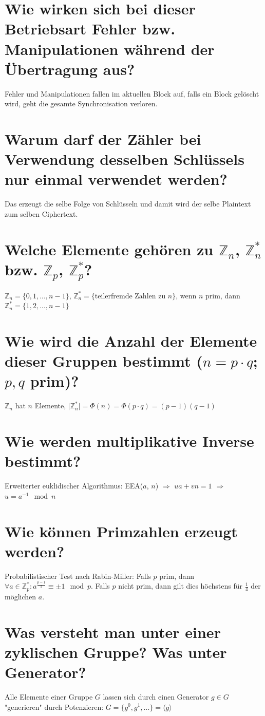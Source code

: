 \documentclass{article}
\begin{document}
	\section*{Wie wirken sich bei dieser Betriebsart Fehler bzw. Manipulationen während der Übertragung aus?}
	Fehler und Manipulationen fallen im aktuellen Block auf, falls ein Block gelöscht wird, geht die gesamte Synchronisation verloren.
	
	\section*{Warum darf der Zähler bei Verwendung desselben Schlüssels nur einmal verwendet werden?}
	Das erzeugt die selbe Folge von Schlüsseln und damit wird der selbe Plaintext zum selben Ciphertext.
	
	\section*{Welche Elemente gehören zu $\mathbb{Z}_n$, $\mathbb{Z}_n^\ast$ bzw. $\mathbb{Z}_p$, $\mathbb{Z}_p^\ast$?}
	$\mathbb{Z}_n = \{0,1,...,n-1\}$, $\mathbb{Z}_n^\ast = \{\text{teilerfremde Zahlen zu } n\}$, wenn $n$ prim, dann $\mathbb{Z}_n^\ast = \{1,2,...,n-1\}$
	
	\section*{Wie wird die Anzahl der Elemente dieser Gruppen bestimmt ($n = p\cdot q$; $p, q$ prim)?}
	$\mathbb{Z}_n$ hat $n$ Elemente, $\vert\mathbb{Z}_n^\ast\vert = \Phi(n) = \Phi(p\cdot q) = (p-1)(q-1)$
	
	\section*{Wie werden multiplikative Inverse bestimmt?}
	Erweiterter euklidischer Algorithmus: EEA($a$, $n$) $\Rightarrow$ $ua + vn = 1$ $\Rightarrow$ $u = a^{-1} \mod n$
	
	\section*{Wie können Primzahlen erzeugt werden?}
	Probabilistischer Test nach Rabin-Miller: Falls $p$ prim, dann $\forall a\in\mathbb{Z}_p^\ast: a^{\frac{p-1}{2}} \equiv \pm 1 \mod p$. Falls $p$ nicht prim, dann gilt dies höchstens für $\frac{1}{4}$ der möglichen $a$.
	
	\section*{Was versteht man unter einer zyklischen Gruppe? Was unter Generator?}
	Alle Elemente einer Gruppe $G$ lassen sich durch einen Generator $g\in G$ "generieren" durch Potenzieren: $G = \{g^0, g^1, ...\} = \langle g\rangle$
	
\end{document}
